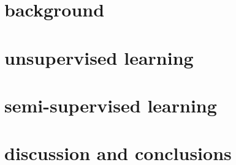 \documentclass[\classfontsize,\papersize,twoside,showtrims,extrafontsizes]{memoir}  %
\begin{document}
\prefrontmatter

\cleartoevenpage

\cleartooddpage

\cleartoevenpage

\frontmatter





% 


\glsaddall{}
\clearforchapter
\printnoidxglossary[title=Acronyms, toctitle=acronyms, type=\acronymtype]
\clearforchapter
\printnoidxglossary[title=Glossary, toctitle=glossary]

\clearforchapter
\printnomenclature

\clearforchapter
\listoffigures*
{}

\clearforchapter
\listoftables*
{}

\clearforchapter
\tableofcontents*

\clearforchapter
\mylistoftodos

\mainmatter

\part[background]{background}\label{part:background}




\part[unsupervised learning]{unsupervised learning}\label{part:unsupervised-learning}




\part[semi-supervised learning]{semi-supervised learning}\label{part:semi-supervised-learning}


\part[discussion and conclusions]{discussion and conclusions}\label{part:discussion-and-conclusion}


\end{document}
